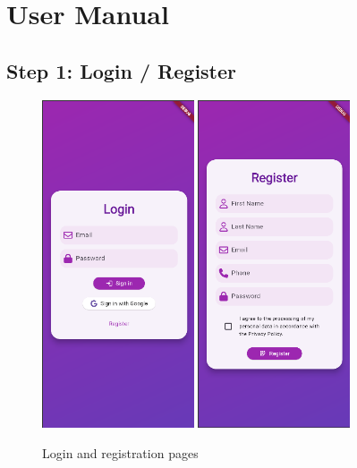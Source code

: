 \section{User Manual}

\subsection*{Step 1: Login / Register}

\begin{figure}[H]
    \centering
    \includegraphics[width=0.4\textwidth]{frontend/login.png}
    \includegraphics[width=0.4\textwidth]{frontend/register.png}
    \caption{Login and registration pages}
\end{figure}

